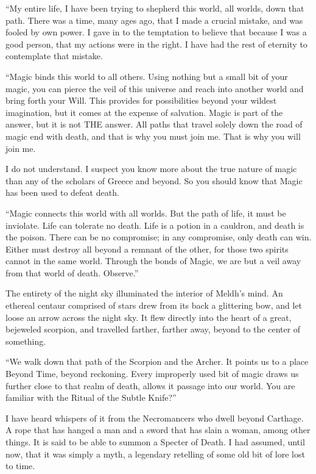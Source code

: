 “My entire life, I have been trying to shepherd this world, all worlds, down that path. There was a time, many ages ago, that I made a crucial mistake, and was fooled by own power. I gave in to the temptation to believe that because I was a good person, that my actions were in the right. I have had the rest of eternity to contemplate that mistake.

“Magic binds this world to all others. Using nothing but a small bit of your magic, you can pierce the veil of this universe and reach into another world and bring forth your Will. This provides for possibilities beyond your wildest imagination, but it comes at the expense of salvation. Magic is part of the answer, but it is not THE answer. All paths that travel solely down the road of magic end with death, and that is why you must join me. That is why you will join me.

I do not understand. I suspect you know more about the true nature of magic than any of the scholars of Greece and beyond. So you should know that Magic has been used to defeat death.

“Magic connects this world with all worlds. But the path of life, it must be inviolate. Life can tolerate no death. Life is a potion in a cauldron, and death is the poison. There can be no compromise; in any compromise, only death can win. Either must destroy all beyond a remnant of the other, for those two spirits cannot in the same world. Through the bonds of Magic, we are but a veil away from that world of death. Observe.”

The entirety of the night sky illuminated the interior of Meldh’s mind. An ethereal centaur comprised of stars drew from its back a glittering bow, and let loose an arrow across the night sky. It flew directly into the heart of a great, bejeweled scorpion, and travelled farther, farther away, beyond to the center of something.

“We walk down that path of the Scorpion and the Archer. It points us to a place Beyond Time, beyond reckoning. Every improperly used bit of magic draws us further close to that realm of death, allows it passage into our world. You are familiar with the Ritual of the Subtle Knife?”

I have heard whispers of it from the Necromancers who dwell beyond Carthage. A rope that has hanged a man and a sword that has slain a woman, among other things. It is said to be able to summon a Specter of Death. I had assumed, until now, that it was simply a myth, a legendary retelling of some old bit of lore lost to time.

